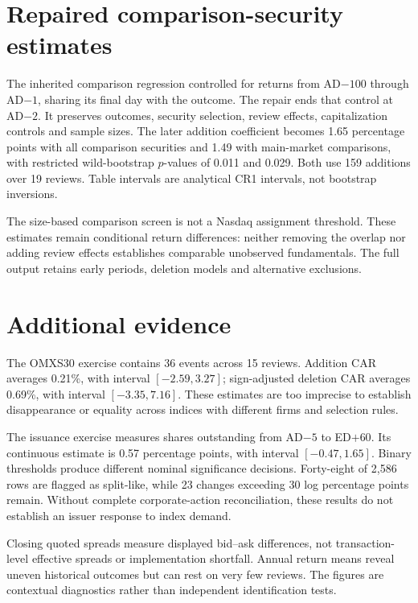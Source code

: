 \section{Repaired comparison-security estimates}
\label{app:comparisons}


The inherited comparison regression controlled for returns from AD$-100$ through AD$-1$, sharing its final day with the outcome. The repair ends that control at AD$-2$. It preserves outcomes, security selection, review effects, capitalization controls and sample sizes. The later addition coefficient becomes 1.65 percentage points with all comparison securities and 1.49 with main-market comparisons, with restricted wild-bootstrap $p$-values of 0.011 and 0.029. Both use 159 additions over 19 reviews. Table intervals are analytical CR1 intervals, not bootstrap inversions.

The size-based comparison screen is not a Nasdaq assignment threshold. These estimates remain conditional return differences: neither removing the overlap nor adding review effects establishes comparable unobserved fundamentals. The full output retains early periods, deletion models and alternative exclusions.
\FloatBarrier

\section{Additional evidence}
\label{app:additional}
\label{app:auxiliary}

The OMXS30 exercise contains 36 events across 15 reviews. Addition CAR averages 0.21\%, with interval $[-2.59,3.27]$; sign-adjusted deletion CAR averages 0.69\%, with interval $[-3.35,7.16]$. These estimates are too imprecise to establish disappearance or equality across indices with different firms and selection rules.

The issuance exercise measures shares outstanding from AD$-5$ to ED$+60$. Its continuous estimate is 0.57 percentage points, with interval $[-0.47,1.65]$. Binary thresholds produce different nominal significance decisions. Forty-eight of 2,586 rows are flagged as split-like, while 23 changes exceeding 30 log percentage points remain. Without complete corporate-action reconciliation, these results do not establish an issuer response to index demand.

Closing quoted spreads measure displayed bid--ask differences, not transaction-level effective spreads or implementation shortfall. Annual return means reveal uneven historical outcomes but can rest on very few reviews. The figures are contextual diagnostics rather than independent identification tests.

